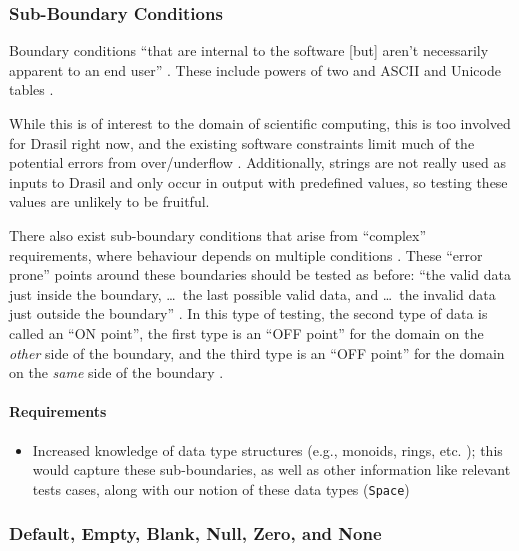 \subsubsection[Sub-Boundary Conditions]{Sub-Boundary Conditions
      \citep[pp.~75-77]{Patton2006}}
\label{sub-bound-conds}

Boundary conditions ``that are internal to the software [but] aren't necessarily
apparent to an end user'' \citep[p.~75]{Patton2006}. These include
powers of two \citep[pp.~75-76]{Patton2006} and ASCII and Unicode tables
\citep[pp.~76-77]{Patton2006}.

While this is of interest to the domain of scientific computing, this is too
involved for Drasil right now, and the existing software constraints limit much
of the potential errors from over/underflow \citep{june_11_meeting}. Additionally,
strings are not really used as inputs to Drasil and only occur in output with
predefined values, so testing these values are unlikely to be fruitful.

There also exist sub-boundary conditions that arise from ``complex''
requirements, where behaviour depends on multiple conditions
\citep[p.~430]{vanVliet2000}. These ``error prone'' points around
these boundaries should be tested \citep[p.~430]{vanVliet2000} as
before: ``the valid data just inside the boundary, \dots\ the last possible
valid data, and \dots\ the invalid data just outside the boundary''
\citep[p.~73]{Patton2006}. In this type of testing, the second type of
data is called an ``ON point'', the first type is an ``OFF point'' for the
domain on the \emph{other} side of the boundary, and the third type is an ``OFF
point'' for the domain on the \emph{same} side of the boundary
\citep[p.~430]{vanVliet2000}.

\paragraph{Requirements}
\begin{itemize}
      \item Increased knowledge of data type structures (e.g., monoids, rings,
            etc. \citep{june_11_meeting}); this would capture these sub-boundaries,
            as well as other information like relevant tests cases, along with
            our notion of these data types (\texttt{Space})
\end{itemize}

\subsubsection[Default, Empty, Blank, Null, Zero, and None]{Default, Empty,
      Blank, Null, Zero, and None \citep[pp.~77-78]{Patton2006}}

